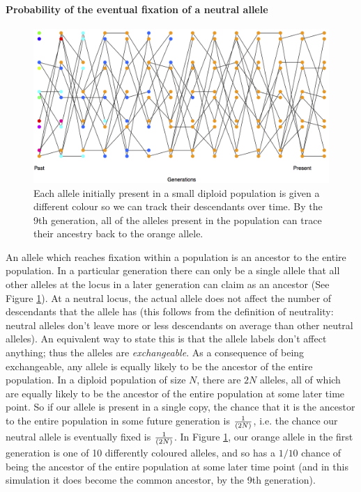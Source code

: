 
\paragraph{Probability of the eventual fixation of a neutral allele}
\begin{figure}
\begin{center}
  \includegraphics[width = \textwidth]{figures/Substitution_sim.png}
\end{center}
\caption{Each allele initially present in a small diploid population is
  given a different colour so we can track their descendants over
  time. By the 9th generation, all of the alleles present in the
  population can trace their ancestry back to the orange allele. } \label{fig:subs_simulation}
\end{figure}

An allele which reaches fixation within a population is an ancestor to the
entire population. In a particular generation there can only be a single allele
that all other alleles at the locus in a later generation can claim as an
ancestor (See Figure \ref{fig:subs_simulation}). At a neutral locus, the actual allele does not affect the number of
descendants that the allele has (this follows from the definition of
neutrality: neutral alleles don't leave more or less descendants on average than other neutral alleles).
An equivalent way to state this is that the allele labels don't affect
anything; thus the alleles are \emph{exchangeable}. As a consequence of being exchangeable,
any allele is equally likely to be the ancestor of the entire population.  In a
diploid population of size $N$, there are $2N$ alleles, all of which are
equally likely to be the ancestor of the entire population at some later time
point. So if our allele is present in a single copy, the chance that it is the
ancestor to the entire population in some future generation is
$\nicefrac{1}{(2N)}$, i.e. the chance our neutral allele is eventually fixed is
$\nicefrac{1}{(2N)}$.  In Figure \ref{fig:subs_simulation}, our orange allele
in the first generation is one of 10 differently coloured alleles, and so has a
$1/10$ chance of being the ancestor of the entire population at some later time
point (and in this simulation it does become the common ancestor, by the 9th generation).\\

